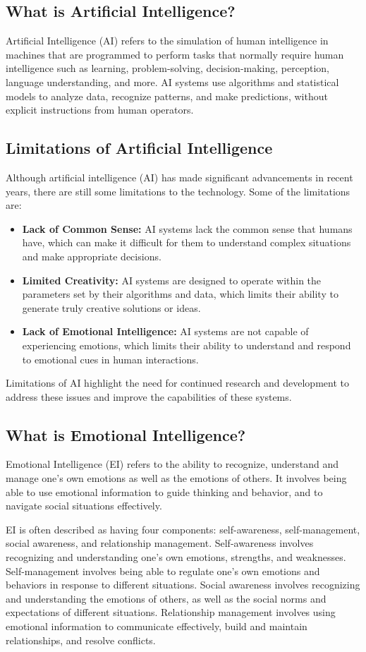 \subsection{What is Artificial Intelligence?}
Artificial Intelligence (AI) refers to the simulation of human intelligence in machines that are programmed to perform tasks that normally require human intelligence such as learning, problem-solving, decision-making, perception, language understanding, and more\cite{ISSN-2456-2165}. AI systems use algorithms and statistical models to analyze data, recognize patterns, and make predictions, without explicit instructions from human operators.
\subsection{Limitations of Artificial Intelligence}
Although artificial intelligence (AI) has made significant advancements in recent years, there are still some limitations to the technology. Some of the limitations are:
\begin{itemize}
	\item \textbf{Lack of Common Sense:} AI systems lack the common sense that humans have, which can make it difficult for them to understand complex situations and make appropriate decisions.
	\item \textbf{Limited Creativity:} AI systems are designed to operate within the parameters set by their algorithms and data, which limits their ability to generate truly creative solutions or ideas.
	\item \textbf{Lack of Emotional Intelligence:} AI systems are not capable of experiencing emotions, which limits their ability to understand and respond to emotional cues in human interactions.
\end{itemize}
Limitations of AI highlight the need for continued research and development to address these issues and improve the capabilities of these systems.
\subsection{What is Emotional Intelligence?}
Emotional Intelligence (EI) refers to the ability to recognize, understand and manage one's own emotions as well as the emotions of others. It involves being able to use emotional information to guide thinking and behavior, and to navigate social situations effectively\cite{ISSN-2456-2165}.

EI is often described as having four components: self-awareness, self-management, social awareness, and relationship management. Self-awareness involves recognizing and understanding one's own emotions, strengths, and weaknesses. Self-management involves being able to regulate one's own emotions and behaviors in response to different situations. Social awareness involves recognizing and understanding the emotions of others, as well as the social norms and expectations of different situations. Relationship management involves using emotional information to communicate effectively, build and maintain relationships, and resolve conflicts.

